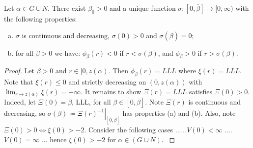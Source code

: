 \newpage
\begin{lemma}Let $\alpha\in G\cup N$. There exist $\beta_0>0$ and a unique function $\sigma:[0,\bar\beta]\to[0,\infty)$ with the following properties: \begin{enumerate}[(a)]
	\item  $\sigma$ is continuous and decreasing, $\sigma(0)>0$ and $\sigma(\bar\beta)=0$;
    \item for all $\beta>0$ we have: $\phi_\beta(r)<0$ if $r<\sigma(\beta)$, and $\phi_\beta>0$ if $r>\sigma(\beta)$.
\end{enumerate}
\begin{proof} 
{\color{gray} Let $\beta>0$ and $r\in[0,z(\alpha)$. Then $\phi_{\beta}(r)=LLL$ where $\xi(r)=LLL$. Note that $\xi(r)\leq0$ and strictly decreasing on $(0,z(\alpha))$ with $\lim_{r\to z(\alpha)}\xi(r)=-\infty$. It remains to show $\Xi(r)=LLL$ satisfies $\Xi(0)>0$. Indeed, let $\Xi(0)=\bar\beta$, LLL, for all $\beta\in[0,\bar\beta]$. Note $\Xi(r)$ is continuous and decreasing, so $\sigma(\beta)\coloneqq\left.\Xi(r)^{-1}\right|_{[0,\bar\beta]}$ has properties (a) and (b). Also, note $\Xi(0)>0\iff\xi(0)>-2$. Consider the following cases ......$V(0)<\infty$ .... $V(0)=\infty$ ... hence $\xi(0)>-2$ for $\alpha\in(G\cup N)$. }
\end{proof}
\end{lemma}

